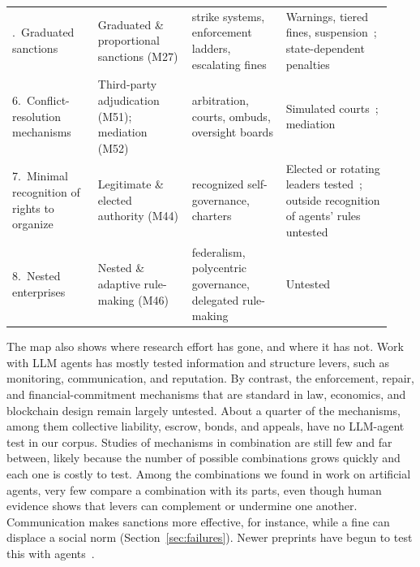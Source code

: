 \documentclass[runningheads]{llncs}
\newcommand{\rowline}{\arrayrulecolor{black!22}\specialrule{0.4pt}{2pt}{2pt}\arrayrulecolor{black}}
\begin{document}
\begin{table}[!tbp]
\begin{tabular}{@{}>{\raggedright\arraybackslash}p{0.21\linewidth} >{\raggedright\arraybackslash}p{0.23\linewidth} >{\raggedright\arraybackslash}p{0.23\linewidth} >{\raggedright\arraybackslash}p{0.26\linewidth}@{}}
5.~Graduated sanctions & Graduated \& proportional sanctions (M27) & strike systems, enforcement ladders, escalating fines & Warnings, tiered fines, suspension~\citep{bracalesyrnikov2026institutionalai}; state-dependent penalties~\citep{yang2026payinghonesty} \\ \rowline
6.~Conflict-resolution mechanisms & Third-party adjudication (M51); mediation (M52) & arbitration, courts, ombuds, oversight boards & Simulated courts~\citep{wang2026lawinsilico}; mediation~\citep{tewolde2026coopevalbenchmarkingcooperationsustainingmechanisms,ngyisheng2026formal} \\ \rowline
7.~Minimal recognition of rights to organize & Legitimate \& elected authority (M44) & recognized self-governance, charters & Elected or rotating leaders tested~\mbox{\citep{faulkner2026evaluatingcooperationllmsocial,seyedin2026politician}}; outside recognition of agents' rules untested \\ \rowline
8.~Nested enterprises & Nested \& adaptive rule-making (M46) & federalism, polycentric governance, delegated rule-making & Untested \\
\bottomrule
\end{tabular}
\end{table}

The map also shows where research effort has gone, and where it has not. Work with LLM agents has mostly tested information and structure levers, such as monitoring, communication, and reputation. By contrast, the enforcement, repair, and financial-commitment mechanisms that are standard in law, economics, and blockchain design remain largely untested. About a quarter of the mechanisms, among them collective liability, escrow, bonds, and appeals, have no LLM-agent test in our corpus. Studies of mechanisms in combination are still few and far between, likely because the number of possible combinations grows quickly and each one is costly to test. Among the combinations we found in work on artificial agents, very few compare a combination with its parts, even though human evidence shows that levers can complement or undermine one another. Communication makes sanctions more effective, for instance, while a fine can displace a social norm (Section~\mbox{\ref{sec:failures}}). Newer preprints have begun to test this with agents~\mbox{\citep{wang2026enforcementgap}}.
\end{document}
